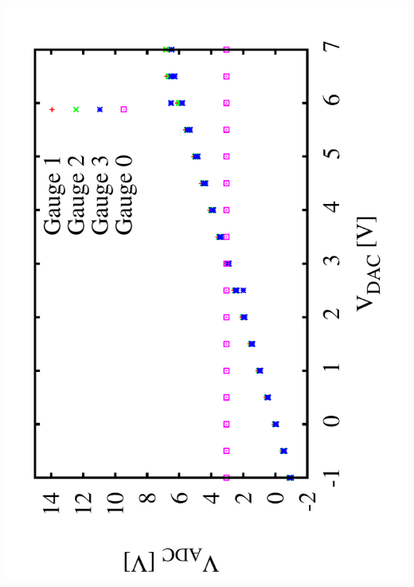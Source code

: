 \documentclass[a4paper,11pt]{book}
\begin{document}
 \hspace*{2cm}\includegraphics[angle=-90,scale=0.15]{image_ai_11.pdf}
\end{document}
